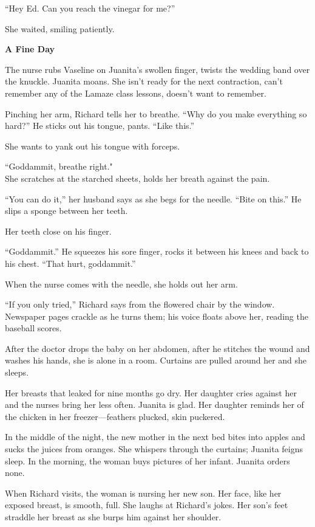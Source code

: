 \documentclass[
]{article}
\begin{document}
``Hey Ed. Can you reach the vinegar for me?''

She waited, smiling patiently.

\textbf{\hfill\break
}

\textbf{A Fine Day}

The nurse rubs Vaseline on Juanita's swollen finger, twists the wedding
band over the knuckle. Juanita moans. She isn't ready for the next
contraction, can't remember any of the Lamaze class lessons, doesn't
want to remember.

Pinching her arm, Richard tells her to breathe. ``Why do you make
everything so hard?'' He sticks out his tongue, pants. ``Like this.''

She wants to yank out his tongue with forceps.

``Goddammit, breathe right."\\
She scratches at the starched sheets, holds her breath against the pain.

``You can do it,'' her husband says as she begs for the needle. ``Bite
on this.'' He slips a sponge between her teeth.

Her teeth close on his finger.

``Goddammit.'' He squeezes his sore finger, rocks it between his knees
and back to his chest. ``That hurt, goddammit.''

When the nurse comes with the needle, she holds out her arm.

``If you only tried,'' Richard says from the flowered chair by the
window. Newspaper pages crackle as he turns them; his voice floats above
her, reading the baseball scores.

After the doctor drops the baby on her abdomen, after he stitches the
wound and washes his hands, she is alone in a room. Curtains are pulled
around her and she sleeps.

Her breasts that leaked for nine months go dry. Her daughter cries
against her and the nurses bring her less often. Juanita is glad. Her
daughter reminds her of the chicken in her freezer---feathers plucked,
skin puckered.

In the middle of the night, the new mother in the next bed bites into
apples and sucks the juices from oranges. She whispers through the
curtains; Juanita feigns sleep. In the morning, the woman buys pictures
of her infant. Juanita orders none.

When Richard visits, the woman is nursing her new son. Her face, like
her exposed breast, is smooth, full. She laughs at Richard's jokes. Her
son's feet straddle her breast as she burps him against her shoulder.
\end{document}
